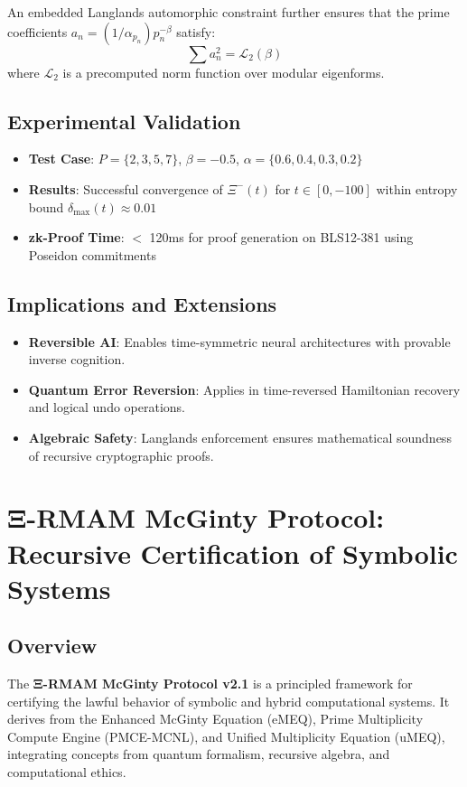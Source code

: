 \documentclass[12]{amsart}
\theoremstyle{plain}
\begin{document}
An embedded Langlands automorphic constraint further ensures that the prime coefficients $a_n = (1/\alpha_{p_n}) p_n^{-\beta}$ satisfy:
\[
\sum a_n^2 = \mathcal{L}_2(\beta)
\]
where $\mathcal{L}_2$ is a precomputed norm function over modular eigenforms.

\subsection{Experimental Validation}

\begin{itemize}
    \item \textbf{Test Case}: $P = \{2, 3, 5, 7\}$, $\beta = -0.5$, $\alpha = \{0.6, 0.4, 0.3, 0.2\}$
    \item \textbf{Results}: Successful convergence of $\Xi^{-}(t)$ for $t \in [0, -100]$ within entropy bound $\delta_{\max}(t) \approx 0.01$
    \item \textbf{zk-Proof Time}: $<$ 120ms for proof generation on BLS12-381 using Poseidon commitments
\end{itemize}

\subsection{Implications and Extensions}

\begin{itemize}
    \item \textbf{Reversible AI}: Enables time-symmetric neural architectures with provable inverse cognition.
    \item \textbf{Quantum Error Reversion}: Applies in time-reversed Hamiltonian recovery and logical undo operations.
    \item \textbf{Algebraic Safety}: Langlands enforcement ensures mathematical soundness of recursive cryptographic proofs.
\end{itemize}

\section{Ξ-RMAM McGinty Protocol: Recursive Certification of Symbolic Systems}

\subsection{Overview}
The \textbf{Ξ-RMAM McGinty Protocol v2.1} is a principled framework for certifying the lawful behavior of symbolic and hybrid computational systems. It derives from the Enhanced McGinty Equation (eMEQ), Prime Multiplicity Compute Engine (PMCE-MCNL), and Unified Multiplicity Equation (uMEQ), integrating concepts from quantum formalism, recursive algebra, and computational ethics.
\end{document}
